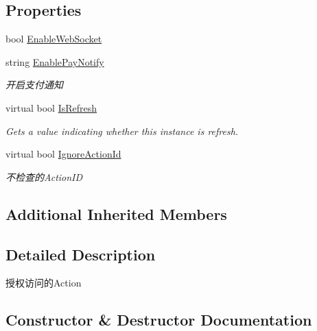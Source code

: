 \subsection*{Properties}
\begin{DoxyCompactItemize}
\item 
bool \mbox{\hyperlink{class_t_net_1_1_contract_1_1_action_1_1_authorize_action_a22f58f4ebbc08d816d6f1b1c3dbf5891}{Enable\+Web\+Socket}}
\item 
string \mbox{\hyperlink{class_t_net_1_1_contract_1_1_action_1_1_authorize_action_ab2d1d0cfc64ce89f0ad2ddb4e75665ad}{Enable\+Pay\+Notify}}
\begin{DoxyCompactList}\small\item\em 开启支付通知 \end{DoxyCompactList}\item 
virtual bool \mbox{\hyperlink{class_t_net_1_1_contract_1_1_action_1_1_authorize_action_a40942af7311c5678d254dd2f482a8253}{Is\+Refresh}}
\begin{DoxyCompactList}\small\item\em Gets a value indicating whether this instance is refresh. \end{DoxyCompactList}\item 
virtual bool \mbox{\hyperlink{class_t_net_1_1_contract_1_1_action_1_1_authorize_action_a330f349810f533614068354233af4a64}{Ignore\+Action\+Id}}
\begin{DoxyCompactList}\small\item\em 不检查的\+Action\+ID \end{DoxyCompactList}\end{DoxyCompactItemize}
\subsection*{Additional Inherited Members}


\subsection{Detailed Description}
授权访问的\+Action 



\subsection{Constructor \& Destructor Documentation}
\mbox{\label{class_t_net_1_1_contract_1_1_action_1_1_authorize_action_ab04a11cc2032cab9ce1145baa9abbad8}} 

